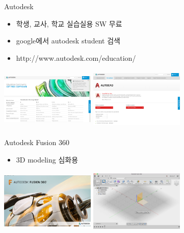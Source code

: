 \documentclass[11pt]{beamer}
\begin{document}
\begin{frame}[t]{Autodesk }\footnotesize
\begin{itemize}
\item 학생, 교사, 학교 실습실용 SW 무료
\item google에서 autodesk student 검색
\item http://www.autodesk.com/education/
\end{itemize}
\includegraphics[width=4.5cm, height=3cm]{./image/98_08.png} \@ \includegraphics[width=4.5cm, height=3cm]{./image/98_09.png} 
\end{frame}

\begin{frame}[t]{Autodesk Fusion 360 }\footnotesize
\begin{itemize}
\item 3D modeling 심화용
\end{itemize}
\includegraphics[width=4.5cm, height=3cm]{./image/98_12.png} \@ \includegraphics[width=4.5cm, height=3cm]{./image/98_13.png} 
\end{frame}
\end{document}
